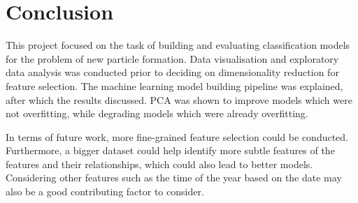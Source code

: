 \chapter{Conclusion}


This project focused on the task of building and evaluating classification models for the problem of new particle formation. Data visualisation and exploratory data analysis was conducted prior to deciding on dimensionality reduction for feature selection. The machine learning model building pipeline was explained, after which the results discussed. PCA was shown to improve models which were not overfitting, while degrading models which were already overfitting.

In terms of future work, more fine-grained feature selection could be conducted. Furthermore, a bigger dataset could help identify more subtle features of the features and their relationships, which could also lead to better models. Considering other features such as the time of the year based on the date may also be a good contributing factor to consider.
